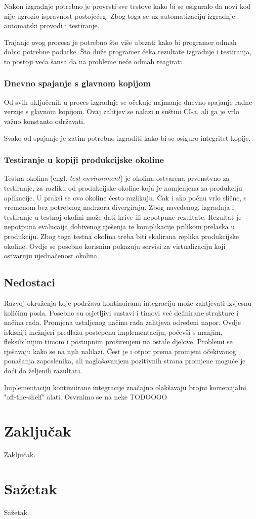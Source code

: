 \documentclass[times, utf8, seminar, numeric]{fer}
\newcommand{\eng}[1]{(engl. \textit{#1})}
\begin{document}
Nakon izgradnje potrebno je provesti sve testove kako bi se osiguralo da novi kod nije ugrozio ispravnost postojećeg. Zbog toga se uz automatizaciju izgradnje automatski provodi i testiranje. 

Trajanje ovog procesa je potrebno što više ubrzati kako bi programer odmah dobio potrebne podatke. Što duže programer ćeka rezultate izgradnje i testiranja, to postoji veća šansa da na probleme neće odmah reagirati.

\subsection{Dnevno spajanje s glavnom kopijom}
Od svih uključenih u proces izgradnje se očekuje najmanje dnevno spajanje radne verzije s glavnom kopijom. Ovaj zahtjev se nalazi u suštini CI-a, ali ga je vrlo važno konstanto održavati. 

Svako od spajanje je zatim potrebno izgraditi kako bi se osiguro integritet kopije.

\subsection{Testiranje u kopiji produkcijske okoline}
Testna okolina \eng{test environment} je okolina ostvarena prvenstvno za testiranje, za razliku od produkcijske okoline koja je namjenjena za produkciju aplikacije. U praksi se ovo okoline često razlikuju. Čak i ako počnu vrlo slične, s vremenom bez potrebnog nadrzora divergiraju. Zbog navedenog, izgradnja i testiranje u testnoj okolini može dati krive ili nepotpune rezultate. Rezultat je nepotpuna evalucaija dobivenog rješenja te komplikacije prilikom prelaska u produkciju. Zbog toga testna okolina treba biti skalirana replika produkcijske okoline. Ovdje se posebno korisnim pokazuju servisi za virtualizaciju koji ostvaruju ujednačenost okolina.

\section{Nedostaci}
Razvoj okruženja koje podržava kontinuiranu integraciju može zahtjevati izvjesnu količinu posla. Posebno su osjetljivi sustavi i timovi već definirane strukture i načina rada. Promjena ustaljenog načina rada zahtjeva određeni napor. Ovdje iskisniji inežnjeri predlažu postepenu implementaciju, počevši s manjim, fleksibilnijim timom i postupnim proširenjem na ostale djelove. Problemi se rješavaju kako se na njih nalilazi. Čest je i otpor prema promjeni očekivanog ponašanja zaposlenika, ali naglašavanjem pozitivnih strana promjene moguće je doći do željenih razultata.

Implementaciju kontinuirane integracije značajno olakšavaju brojni komercijalni "off-the-shelf" alati. Osvrnimo se na neke TODOOOO


\chapter{Zaključak}
Zaključak.




\chapter{Sažetak}
Sažetak.
\end{document}
